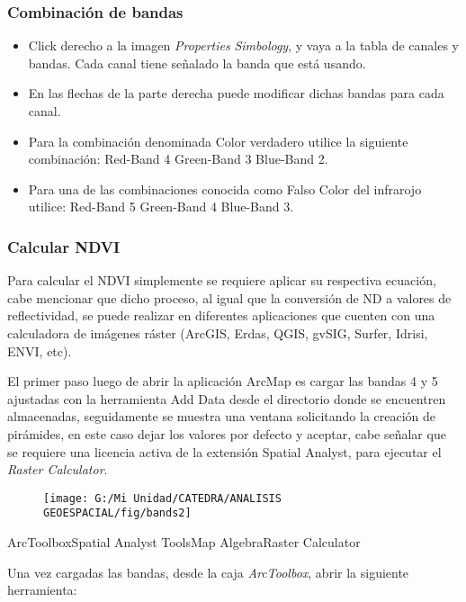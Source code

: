 \documentclass[a4paper,oneside,11pt,]{article}
\begin{document}
\subsubsection{Combinación de  bandas}
\begin{itemize}
\item Click derecho a la imagen \emph{Properties} \textrightarrow  \emph{Simbology}, y vaya a la tabla de canales y bandas. Cada canal tiene señalado la banda que está usando.
\item En las flechas de la parte derecha puede modificar dichas bandas para cada canal.
\item Para la combinación denominada Color verdadero utilice la siguiente combinación: 
\subitem	Red-Band 4
\subitem	Green-Band 3
\subitem	Blue-Band 2.
\item Para una de las combinaciones conocida como Falso Color del infrarojo utilice: 
\subitem	Red-Band 5
\subitem	Green-Band 4
\subitem	Blue-Band 3.
\end{itemize}

\subsubsection{Calcular NDVI}
Para calcular el NDVI simplemente se requiere aplicar su respectiva ecuación, cabe mencionar que dicho proceso, al igual que la conversión de ND a valores de reflectividad, se puede realizar en diferentes aplicaciones que cuenten con una calculadora de imágenes ráster (ArcGIS, Erdas, QGIS, gvSIG, Surfer, Idrisi, ENVI, etc).
\par El primer paso luego de abrir la aplicación ArcMap es cargar las bandas 4 y 5 ajustadas con la herramienta Add Data desde el directorio donde se encuentren almacenadas, seguidamente se muestra una ventana solicitando la creación de pirámides, en este caso dejar los valores por defecto y aceptar, cabe señalar que se requiere una licencia activa de la extensión Spatial Analyst, para ejecutar el \emph{Raster Calculator}.

\begin{figure}
\centering
\texttt{[image: G:/Mi Unidad/CATEDRA/ANALISIS GEOESPACIAL/fig/bands2]}
\end{figure}

ArcToolbox\textrightarrow Spatial Analyst Tools\textrightarrow Map Algebra\textrightarrow Raster Calculator

Una vez cargadas las bandas, desde la caja \emph{ArcToolbox}, abrir la siguiente herramienta:
\end{document}
